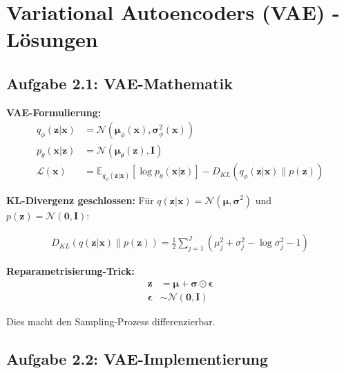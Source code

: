 ﻿\documentclass[12pt,a4paper]{article}
\begin{document}
\section{Variational Autoencoders (VAE) - Lösungen}

\subsection{Aufgabe 2.1: VAE-Mathematik}

\textbf{VAE-Formulierung:}
\begin{align}
q_\phi(\mathbf{z}|\mathbf{x}) &= \mathcal{N}(\boldsymbol{\mu}_\phi(\mathbf{x}), \boldsymbol{\sigma}_\phi^2(\mathbf{x})) \\
p_\theta(\mathbf{x}|\mathbf{z}) &= \mathcal{N}(\boldsymbol{\mu}_\theta(\mathbf{z}), \mathbf{I}) \\
\mathcal{L}(\mathbf{x}) &= \mathbb{E}_{q_\phi(\mathbf{z}|\mathbf{x})}[\log p_\theta(\mathbf{x}|\mathbf{z})] - D_{KL}(q_\phi(\mathbf{z}|\mathbf{x}) \| p(\mathbf{z}))
\end{align}

\textbf{KL-Divergenz geschlossen:}
Für $q(\mathbf{z}|\mathbf{x}) = \mathcal{N}(\boldsymbol{\mu}, \boldsymbol{\sigma}^2)$ und $p(\mathbf{z}) = \mathcal{N}(\mathbf{0}, \mathbf{I})$:

\begin{align}
D_{KL}(q(\mathbf{z}|\mathbf{x}) \| p(\mathbf{z})) = \frac{1}{2} \sum_{j=1}^J (\mu_j^2 + \sigma_j^2 - \log \sigma_j^2 - 1)
\end{align}

\textbf{Reparametrisierung-Trick:}
\begin{align}
\mathbf{z} &= \boldsymbol{\mu} + \boldsymbol{\sigma} \odot \boldsymbol{\epsilon} \\
\boldsymbol{\epsilon} &\sim \mathcal{N}(\mathbf{0}, \mathbf{I})
\end{align}

Dies macht den Sampling-Prozess differenzierbar.

\subsection{Aufgabe 2.2: VAE-Implementierung}
\end{document}
